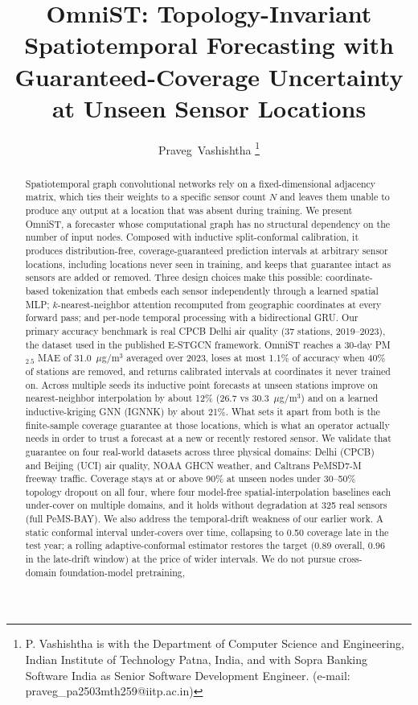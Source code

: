 \documentclass[journal]{IEEEtran}
\begin{document}
\title{OmniST: Topology-Invariant Spatiotemporal Forecasting with\\ Guaranteed-Coverage Uncertainty at Unseen Sensor Locations}

\author{Praveg~Vashishtha
\thanks{P. Vashishtha is with the Department of Computer Science and Engineering, Indian Institute of Technology Patna, India, and with Sopra Banking Software India as Senior Software Development Engineer. (e-mail: praveg\_pa2503mth259@iitp.ac.in)}}

\maketitle

\begin{abstract}
Spatiotemporal graph convolutional networks rely on a fixed-dimensional adjacency matrix, which ties their weights to a specific sensor count $N$ and leaves them unable to produce any output at a location that was absent during training. We present OmniST, a forecaster whose computational graph has no structural dependency on the number of input nodes. Composed with inductive split-conformal calibration, it produces distribution-free, coverage-guaranteed prediction intervals at arbitrary sensor locations, including locations never seen in training, and keeps that guarantee intact as sensors are added or removed. Three design choices make this possible: coordinate-based tokenization that embeds each sensor independently through a learned spatial MLP; $k$-nearest-neighbor attention recomputed from geographic coordinates at every forward pass; and per-node temporal processing with a bidirectional GRU. Our primary accuracy benchmark is real CPCB Delhi air quality (37 stations, 2019--2023), the dataset used in the published E-STGCN framework. OmniST reaches a 30-day PM$_{2.5}$ MAE of 31.0~$\mu$g/m$^3$ averaged over 2023, loses at most 1.1\% of accuracy when 40\% of stations are removed, and returns calibrated intervals at coordinates it never trained on. Across multiple seeds its inductive point forecasts at unseen stations improve on nearest-neighbor interpolation by about 12\% (26.7 vs 30.3~$\mu$g/m$^3$) and on a learned inductive-kriging GNN (IGNNK) by about 21\%. What sets it apart from both is the finite-sample coverage guarantee at those locations, which is what an operator actually needs in order to trust a forecast at a new or recently restored sensor. We validate that guarantee on four real-world datasets across three physical domains: Delhi (CPCB) and Beijing (UCI) air quality, NOAA GHCN weather, and Caltrans PeMSD7-M freeway traffic. Coverage stays at or above 90\% at unseen nodes under 30--50\% topology dropout on all four, where four model-free spatial-interpolation baselines each under-cover on multiple domains, and it holds without degradation at 325 real sensors (full PeMS-BAY). We also address the temporal-drift weakness of our earlier work. A static conformal interval under-covers over time, collapsing to 0.50 coverage late in the test year; a rolling adaptive-conformal estimator restores the target (0.89 overall, 0.96 in the late-drift window) at the price of wider intervals. We do not pursue cross-domain foundation-model pretraining, 
\end{abstract}
\end{document}
